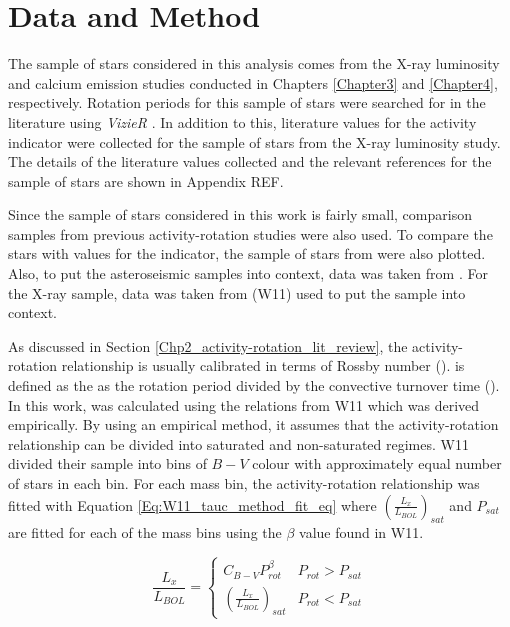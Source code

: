 \section{Data and Method}

The sample of stars considered in this analysis comes from the X-ray luminosity and calcium emission studies conducted in Chapters \ref{Chapter3} and \ref{Chapter4}, respectively. Rotation periods for this sample of stars were searched for in the literature using \textit{VizieR} \citep{Ochsenbein_etal_2000}. In addition to this, literature values for the \Rprime activity indicator were collected for the sample of stars from the X-ray luminosity study. The details of the literature values collected and the relevant references for the sample of stars are shown in Appendix REF.

Since the sample of stars considered in this work is fairly small, comparison samples from previous activity-rotation studies were also used. To compare the stars with values for the \Rprime indicator, the sample of stars from \citet{Metcalfe_etal_2016} were also plotted. Also, to put the asteroseismic samples into context, data was taken from \citet{Baliunas_etal_1996}. For the X-ray sample, data was taken from \citet{Wright_etal_2011} (W11) used to put the sample into context.

As discussed in Section \ref{Chp2_activity-rotation_lit_review}, the activity-rotation relationship is usually calibrated in terms of Rossby number (\Ro). \Ro is defined as the as the rotation period divided by the convective turnover time (\tauc). In this work, \tauc was calculated using the relations from W11 which was derived empirically. By using an empirical method, it assumes that the activity-rotation relationship can be divided into saturated and non-saturated regimes. W11 divided their sample into bins of $B-V$ colour with approximately equal number of stars in each bin. For each mass bin, the activity-rotation relationship was fitted with Equation \ref{Eq:W11_tauc_method_fit_eq} where $(\frac{L_{x}}{L_{BOL}})_{sat}$ and $P_{sat}$ are fitted for each of the mass bins using the $\beta$ value found in W11.

\begin{equation}
    \frac{L_{x}}{L_{BOL}} = 
    \begin{cases}
        C_{B-V}P_{rot}^{\beta} & P_{rot} > P_{sat} \\
        (\frac{L_{x}}{L_{BOL}})_{sat} & P_{rot} < P_{sat}
    \end{cases}
    \label{Eq:W11_tauc_method_fit_eq}
\end{equation}

